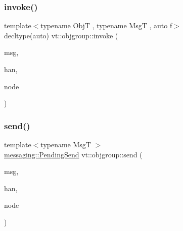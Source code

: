 \mbox{\label{namespacevt_1_1objgroup_a93db5149930b07803d8cc987449baa66}} 
\subsubsection{\texorpdfstring{invoke()}{invoke()}}
{\footnotesize\ttfamily template$<$typename ObjT , typename MsgT , auto f$>$ \\
decltype(auto) vt\+::objgroup\+::invoke (\begin{DoxyParamCaption}\item[{\hyperlink{structvt_1_1messaging_1_1_msg_shared_ptr}{messaging\+::\+Msg\+Shared\+Ptr}$<$ MsgT $>$}]{msg,  }\item[{\hyperlink{namespacevt_af64846b57dfcaf104da3ef6967917573}{Handler\+Type}}]{han,  }\item[{\hyperlink{namespacevt_a866da9d0efc19c0a1ce79e9e492f47e2}{Node\+Type}}]{node }\end{DoxyParamCaption})}

\mbox{\label{namespacevt_1_1objgroup_a6efc2df6997b609c551848af332cfb15}} 
\subsubsection{\texorpdfstring{send()}{send()}}
{\footnotesize\ttfamily template$<$typename MsgT $>$ \\
\hyperlink{structvt_1_1messaging_1_1_pending_send}{messaging\+::\+Pending\+Send} vt\+::objgroup\+::send (\begin{DoxyParamCaption}\item[{\hyperlink{namespacevt_ab2b3d506ec8e8d1540aede826d84a239}{Msg\+Shared\+Ptr}$<$ MsgT $>$}]{msg,  }\item[{\hyperlink{namespacevt_af64846b57dfcaf104da3ef6967917573}{Handler\+Type}}]{han,  }\item[{\hyperlink{namespacevt_a866da9d0efc19c0a1ce79e9e492f47e2}{Node\+Type}}]{node }\end{DoxyParamCaption})}

